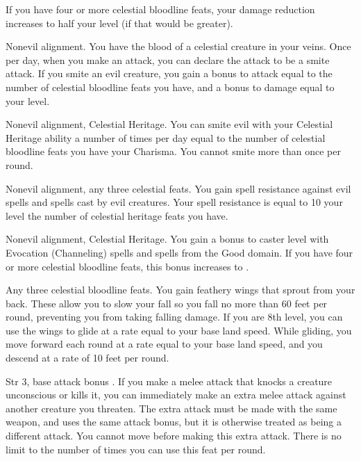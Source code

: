 If you have four or more celestial bloodline feats, your damage reduction increases to half your level (if that would be greater).

 Nonevil alignment.
 You have the blood of a celestial creature in your veins. Once per day, when you make an attack, you can declare the attack to be a smite attack. If you smite an evil creature, you gain a bonus to attack equal to the number of celestial bloodline feats you have, and a bonus to damage equal to your level.

 Nonevil alignment, Celestial Heritage.
 You can smite evil with your Celestial Heritage ability a number of times per day equal to the number of celestial bloodline feats you have \add your Charisma. You cannot smite more than once per round.

 Nonevil alignment, any three celestial feats.
 You gain spell resistance against evil spells and spells cast by evil creatures. Your spell resistance is equal to 10 \add your level \add the number of celestial heritage feats you have.

 Nonevil alignment, Celestial Heritage.
 You gain a  bonus to caster level with Evocation (Channeling) spells and spells from the Good domain. If you have four or more celestial bloodline feats, this bonus increases to .

 Any three celestial bloodline feats.
 You gain feathery wings that sprout from your back. These allow you to slow your fall so you fall no more than 60 feet per round, preventing you from taking falling damage. If you are 8th level, you can use the wings to glide at a rate equal to your base land speed. While gliding, you move forward each round at a rate equal to your base land speed, and you descend at a rate of 10 feet per round.

 Str 3, base attack bonus .
 If you make a melee attack that knocks a creature unconscious or kills it, you can immediately make an extra melee attack against another creature you threaten. The extra attack must be made with the same weapon, and uses the same attack bonus, but it is otherwise treated as being a different attack. You cannot move before making this extra attack. There is no limit to the number of times you can use this feat per round.

